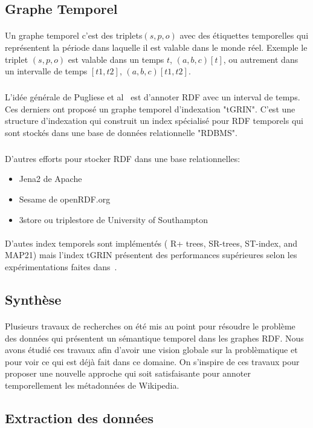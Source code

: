 \documentclass[12pt,a4	]{report}
\begin{document}
\subsection*{Graphe Temporel}
\paragraph{}
Un graphe temporel c'est des triplets$(s,p,o)$ avec des étiquettes temporelles qui représentent la période dans laquelle il est valable dans le monde réel.
Exemple le triplet $(s,p,o)$ est valable dans un temps $t$, $(a,b,c)[t]$, ou autrement dans un intervalle de temps $[t1,t2]$, $(a,b,c)[t1,t2]$.
\subparagraph{}
L'idée générale de Pugliese et al~\cite{pugliese2008} est d'annoter RDF avec un interval de temps.
Ces derniers ont proposé un graphe temporel d'indexation "tGRIN". C'est une structure d’indexation qui construit un index spécialisé pour RDF temporels qui sont stockés dans une base de données relationnelle "RDBMS".
\subparagraph{}
D’autres efforts pour stocker RDF dans une base relationnelles:
\begin{itemize}
\item Jena2 de Apache
\item Sesame de openRDF.org
\item 3store ou triplestore de University of Southampton
\end{itemize}
\paragraph{}
D'autes index temporels sont implémentés ( R+ trees, SR-trees, ST-index, and MAP21) mais l'index tGRIN présentent des performances supérieures selon les expérimentations faites dans~\cite{pugliese2008}.
\subsection*{Synthèse}
\paragraph{}
Plusieurs travaux de recherches on été mis au point pour résoudre le problème des données qui présentent un sémantique temporel dans les graphes RDF. Nous avons étudié ces travaux afin d'avoir une vision globale sur la problèmatique et pour voir ce qui est déjà fait dans ce domaine. On s'inspire de ces travaux pour proposer une nouvelle approche qui soit satisfaisante pour annoter temporellement les métadonnées de Wikipedia.
\subsection*{Extraction des données}
\end{document}
